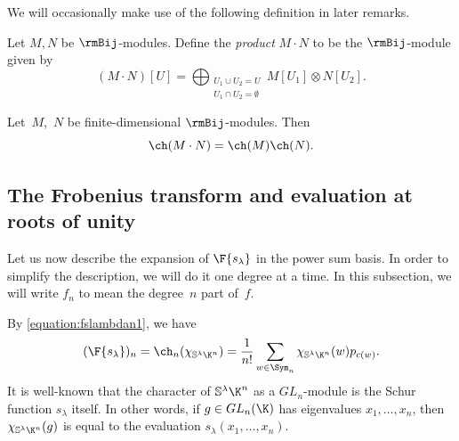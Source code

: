 We will occasionally make use of the following definition in later remarks.
\begin{defi}[{\cite[Section~4.1]{MR0927763}}]\label{definition:speciesproduct}
    Let $M, N$ be $\rmBij$-modules. Define the \emph{product} $M \cdot N$ to be the $\rmBij$-module given by \[(M \cdot N)[U] = \bigoplus_{\substack{U_1 \cup U_2 = U \\ U_1 \cap U_2 = \emptyset}} M[U_1] \otimes N[U_2].\]
\end{defi}
\begin{prop}[{\cite[Proposition~2.1]{MR1132426}}]
    \label{proposition:moduleproduct}
    Let~$M$,~$N$ be finite-dimensional $\rmBij$-modules. Then \[\ch(M \cdot N) = \ch(M) \ch(N).\]
\end{prop}
\subsection{The Frobenius transform and evaluation at roots of unity}\label{subsection:rootsofunity}
Let us now describe the expansion of $\F{s_\lambda}$ in the power sum basis. In order to simplify the description, we will do it one degree at a time. In this subsection, we will write $f_n$ to mean the degree~$n$ part of~$f$.

By \eqref{equation:fslambdan1}, we have
\begin{equation}\label{equation:fslambdan2}
(\F{s_\lambda})_n = \ch_n(\chi_{\mathbb{S}^\lambda \K^n}) = \frac{1}{n!} \sum_{w \in \Sym_n} \chi_{\mathbb{S}^\lambda \K^n}(w) p_{c(w)}.
\end{equation}
It is well-known \cite[Section~8.3]{MR1464693} that the character of $\mathbb{S}^\lambda \K^n$ as a $GL_n$-module is the Schur function $s_\lambda$ itself. In other words, if $g \in GL_n(\K)$ has eigenvalues $x_1, \ldots, x_n$, then $\chi_{\mathbb{S}^\lambda \K^n}(g)$ is equal to the evaluation $s_\lambda(x_1, \ldots, x_n)$.

